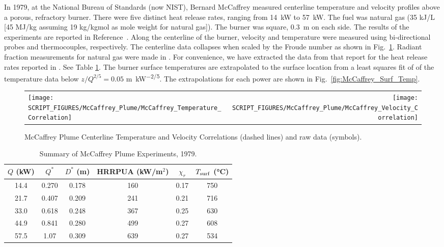 In 1979, at the National Bureau of Standards (now NIST), Bernard McCaffrey measured centerline temperature and velocity profiles above a porous, refractory burner. There were five distinct heat release rates, ranging from 14~kW to 57~kW. The fuel was natural gas (35 kJ/L [45 MJ/kg assuming 19 kg/kgmol as mole weight for natural gas]). The burner was square, 0.3~m on each side. The results of the experiments are reported in Reference~\cite{McCaffrey:NBSIR_79-1910}. Along the centerline of the burner, velocity and temperature were measured using bi-directional probes and thermocouples, respectively.  The centerline data collapses when scaled by the Froude number as shown in Fig.~\ref{fig:McCaffrey_Correlations}. Radiant fraction measurements for natural gas were made in \cite{McCaffrey:1981}.  For convenience, we have extracted the data from that report for the heat release rates reported in \cite{McCaffrey:NBSIR_79-1910}.  See Table \ref{tab:McCaffrey_Plume_Exp}.  The burner surface temperatures are extrapolated to the surface location from a least squares fit of of the temperature data below $z/Q^{2/5} = 0.05$ \si{m.kW^{-2/5}}.  The extrapolations for each power are shown in Fig.~\ref{fig:McCaffrey_Surf_Temp}.

\begin{figure}[!ht]
\begin{tabular*}{\textwidth}{l@{\extracolsep{\fill}}r}
\texttt{[image: SCRIPT\_FIGURES/McCaffrey\_Plume/McCaffrey\_Temperature\_Correlation]} &
\texttt{[image: SCRIPT\_FIGURES/McCaffrey\_Plume/McCaffrey\_Velocity\_Correlation]} \\
\end{tabular*}
\caption[McCaffrey Plume Centerline Temperature and Velocity Correlations]
{McCaffrey Plume Centerline Temperature and Velocity Correlations (dashed lines) and raw data (symbols).}
\label{fig:McCaffrey_Correlations}
\end{figure}

\begin{table}[!ht]
\caption[Summary of McCaffrey Plume Experiments]{Summary of McCaffrey Plume Experiments, 1979.}
\begin{center}
\begin{tabular}{|c|c|c|c|c|c|}
\hline
$Q$ (kW) & $Q^*$    & $D^*$ (m)   & HRRPUA (kW/m$^2$)  & $\chi_r$ & $T_{\rm surf}$ (\si{\degreeCelsius}) \\ \hline\hline
14.4     & 0.270    & 0.178       & 160                & 0.17     & 750 \\ \hline
21.7     & 0.407    & 0.209       & 241                & 0.21     & 716 \\ \hline
33.0     & 0.618    & 0.248       & 367                & 0.25     & 630 \\ \hline
44.9     & 0.841    & 0.280       & 499                & 0.27     & 608 \\ \hline
57.5     & 1.07     & 0.309       & 639                & 0.27     & 534 \\ \hline
\end{tabular}
\end{center}
\label{tab:McCaffrey_Plume_Exp}
\end{table}

